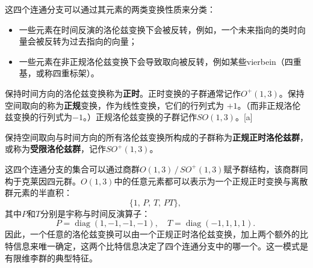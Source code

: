 这四个连通分支可以通过其元素的两类变换性质来分类：
\begin{itemize}
  \item 一些元素在时间反演的洛伦兹变换下会被反转，例如，一个未来指向的类时向量会被反转为过去指向的向量；
  \item 一些元素在非正规洛伦兹变换下会导致取向被反转，例如某些vierbein（四重基，或称四重标架）。
\end{itemize}
保持时间方向的洛伦兹变换称为\textbf{正时}。正时变换的子群通常记作$O^{+}(1,3)$。保持空间取向的称为\textbf{正规}变换，作为线性变换，它们的行列式为 $+1$。（而非正规洛伦兹变换的行列式为$-1$。）正规洛伦兹变换的子群记作$SO(1,3)$。[a]

保持空间取向与时间方向的所有洛伦兹变换所构成的子群称为\textbf{正规正时洛伦兹群}，或称为\textbf{受限洛伦兹群}，记作$SO^{+}(1,3)$。

这四个连通分支的集合可以通过商群$O(1,3)\,/\,SO^{+}(1,3)$赋予群结构，该商群同构于克莱因四元群。$O(1,3)$中的任意元素都可以表示为一个正规正时变换与离散群元素的半直积：
\[
\{1,\, P,\, T,\, PT\},~
\]
其中$P$和$T$分别是宇称与时间反演算子：
\[
P = \operatorname{diag}(1,-1,-1,-1), 
\quad 
T = \operatorname{diag}(-1,1,1,1).~
\]
因此，一个任意的洛伦兹变换可以由一个正规正时洛伦兹变换，加上两个额外的比特信息来唯一确定，这两个比特信息决定了四个连通分支中的哪一个。这一模式是有限维李群的典型特征。
